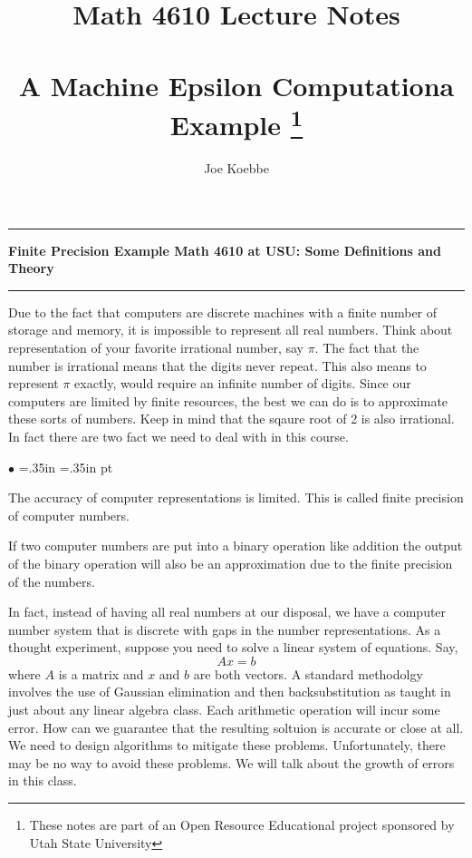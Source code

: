 \documentclass[10pt,fleqn]{article}
\title{Math 4610 Lecture Notes \\
            \ \\
       A Machine Epsilon Computationa Example
  \footnote{These notes are part of an Open Resource Educational project
            sponsored by Utah State University}}
\author{Joe Koebbe}
\begin{document}
\maketitle
\newpage

\vskip0.1in\hrule\vskip0.1in
\noindent
{\bf Finite Precision Example Math 4610 at USU: Some Definitions and Theory} 
\vskip0.1in\hrule\vskip0.1in
\noindent
Due to the fact that computers are discrete machines with a finite number of
storage and memory, it is impossible to represent all real numbers. Think about
representation of your favorite irrational number, say $\pi$. The fact that the
number is irrational means that the digits never repeat. This also means to
represent $\pi$ exactly, would require an infinite number of digits. Since our
computers are limited by finite resources, the best we can do is to approximate
these sorts of numbers. Keep in mind that the sqaure root of 2 is also
irrational. In fact there are two fact we need to deal with in this course.
\begin{list}{$\bullet$}{ \parsep=0pt \listparindent=0pt
\topsep=0pt \rightmargin=.35in \leftmargin=.35in  pt \itemsep=2pt}
  \item The accuracy of computer representations is limited. This is called
        finite precision of computer numbers.
  \item If two computer numbers are put into a binary operation like addition
        the output of the binary operation will also be an approximation due to
        the finite precision of the numbers.
\end{list}
In fact, instead of having all real numbers at our disposal, we have a computer
number system that is discrete with gaps in the number representations. As a
thought experiment, suppose you need to solve a linear system of equations. Say,
\[
   A x = b
\]
where $A$ is a matrix and $x$ and $b$ are both vectors. A standard methodolgy
involves the use of Gaussian elimination and then backsubstitution as taught in
just about any linear algebra class. Each arithmetic operation will incur some
error. How can we guarantee that the resulting soltuion is accurate or close at
all. We need to design algorithms to mitigate these problems. Unfortunately,
there may be no way to avoid these problems. We will talk about the growth of
errors in this class.
\end{document}
